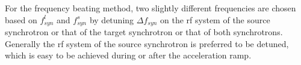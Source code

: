 %
For the frequency beating method, two slightly different frequencies are chosen based on $f_{\mathit{syn}}^{l}$ and $f_{\mathit{syn}}^{s}$ by detuning $\Delta f_\mathit{syn}$ on the rf system of the source synchrotron or that of the target synchrotron or that of both synchrotrons. Generally the rf system of the source synchrotron is preferred to be detuned, which is easy to be achieved during or after the acceleration ramp. 


